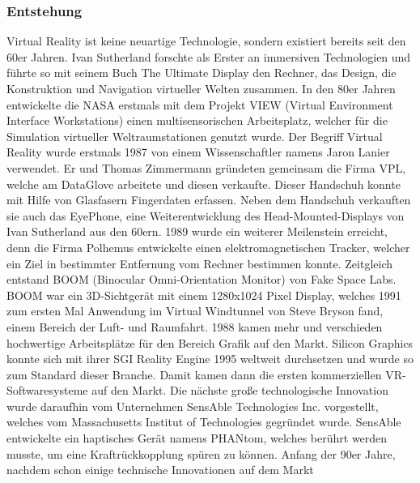 \documentclass[a4paper,12pt,oneside]{article}
\begin{document}
      \subsubsection{Entstehung}
        Virtual Reality ist keine neuartige Technologie, sondern existiert
        bereits seit den 60er Jahren. Ivan Sutherland forschte als Erster an immersiven 
        Technologien und führte so mit seinem Buch \glqq The Ultimate Display\grqq{} 
        den Rechner, das Design, die Konstruktion und Navigation virtueller Welten zusammen.
        In den 80er Jahren entwickelte die NASA erstmals mit dem Projekt VIEW (Virtual 
        Environment Interface Workstations) einen multisensorischen Arbeitsplatz, welcher für 
        die Simulation virtueller Weltraumstationen genutzt wurde.
        Der Begriff Virtual Reality wurde erstmals 1987 von einem Wissenschaftler namens Jaron
        Lanier verwendet. Er und Thomas Zimmermann gründeten gemeinsam die Firma VPL, welche
        am \glqq DataGlove\grqq{} arbeitete und diesen verkaufte. Dieser Handschuh konnte 
        mit Hilfe
        von Glasfasern Fingerdaten erfassen. Neben dem Handschuh verkauften sie auch das 
        \glqq EyePhone\grqq{}, eine Weiterentwicklung des Head-Mounted-Displays von Ivan
        Sutherland aus den 60ern.
        1989 wurde ein weiterer Meilenstein erreicht, denn die Firma Polhemus entwickelte 
        einen elektromagnetischen Tracker, welcher ein Ziel in bestimmter Entfernung vom 
        Rechner bestimmen konnte. 
        Zeitgleich entstand BOOM (Binocular Omni-Orientation Monitor) von Fake Space Labs.
        BOOM war ein 3D-Sichtgerät mit einem 1280x1024 Pixel Display, welches 1991 zum 
        ersten Mal Anwendung im \glqq Virtual Windtunnel\grqq{} von Steve Bryson fand, 
        einem Bereich der Luft- und Raumfahrt.
        1988 kamen mehr und verschieden hochwertige Arbeitsplätze für den Bereich Grafik 
        auf den Markt.
        Silicon Graphics konnte sich mit ihrer SGI Reality Engine 1995 weltweit durchsetzen
        und wurde so zum Standard dieser Branche. Damit kamen dann die ersten kommerziellen
        VR-Softwaresysteme auf den Markt.
        Die nächste große technologische Innovation wurde daraufhin vom Unternehmen SensAble
        Technologies Inc. vorgestellt, welches vom Massachusetts Institut of Technologies
        gegründet wurde. SensAble entwickelte ein haptisches Gerät namens 
        \glqq PHANtom\grqq{}, welches berührt werden musste, um eine
        Kraftrückkopplung spüren zu können.
        Anfang der 90er Jahre, nachdem schon einige technische Innovationen auf dem Markt
\end{document}
